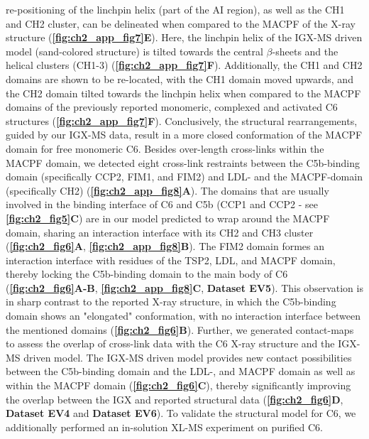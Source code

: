re-positioning of the linchpin helix (part of the AI region), as well as the CH1 and CH2 cluster, can be delineated when compared to the MACPF of the X-ray structure (\textbf{\autoref{fig:ch2_app_fig7}E}). Here, the linchpin helix of the IGX-MS driven model (sand-colored structure) is tilted towards the central $\beta$-sheets and the helical clusters (CH1-3) (\textbf{\autoref{fig:ch2_app_fig7}F}). Additionally, the CH1 and CH2 domains are shown to be re-located, with the CH1 domain moved upwards, and the CH2 domain tilted towards the linchpin helix when compared to the MACPF domains of the previously reported monomeric, complexed and activated C6 structures (\textbf{\autoref{fig:ch2_app_fig7}F}). Conclusively, the structural rearrangements, guided by our IGX-MS data, result in a more closed conformation of the MACPF domain for free monomeric C6. Besides over-length cross-links within the MACPF domain, we detected eight cross-link restraints between the C5b-binding domain (specifically CCP2, FIM1, and FIM2) and LDL- and the MACPF-domain (specifically CH2) (\textbf{\autoref{fig:ch2_app_fig8}A}). The domains that are usually involved in the binding interface of C6 and C5b (CCP1 and CCP2 - see \textbf{\autoref{fig:ch2_fig5}C}) are in our model predicted to wrap around the MACPF domain, sharing an interaction interface with its CH2 and CH3 cluster (\textbf{\autoref{fig:ch2_fig6}A}, \textbf{\autoref{fig:ch2_app_fig8}B}). The FIM2 domain formes an interaction interface with residues of the TSP2, LDL, and MACPF domain, thereby locking the C5b-binding domain to the main body of C6 (\textbf{\autoref{fig:ch2_fig6}A-B}, \textbf{\autoref{fig:ch2_app_fig8}C}, \textbf{Dataset EV5}). This observation is in sharp contrast to the reported X-ray structure, in which the C5b-binding domain shows an "elongated" conformation, with no interaction interface between the mentioned domains (\textbf{\autoref{fig:ch2_fig6}B}). Further, we generated contact-maps to assess the overlap of cross-link data with the C6 X-ray structure and the IGX-MS driven model. The IGX-MS driven model provides new contact possibilities between the C5b-binding domain and the LDL-, and MACPF domain as well as within the MACPF domain (\textbf{\autoref{fig:ch2_fig6}C}), thereby significantly improving the overlap between the IGX and reported structural data (\textbf{\autoref{fig:ch2_fig6}D}, \textbf{Dataset EV4} and \textbf{Dataset EV6}). To validate the structural model for C6, we additionally performed an in-solution XL-MS experiment on purified C6.
